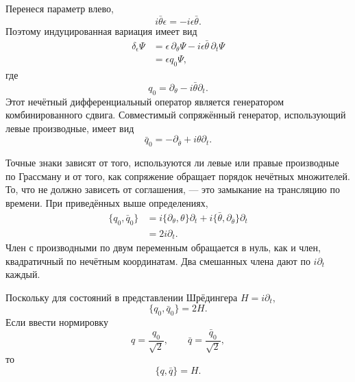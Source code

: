 Перенеся параметр влево,
\begin{equation}
i\bar\theta\epsilon=-i\epsilon\bar\theta.
\end{equation}
Поэтому индуцированная вариация имеет вид
\begin{align}
\delta_\epsilon\Psi
&=\epsilon\,\partial_\theta\Psi
-i\epsilon\bar\theta\,\partial_t\Psi\\
&=\epsilon q_0\Psi,
\end{align}
где
\begin{equation}
q_0=\partial_\theta-i\bar\theta\partial_t.
\end{equation}
Этот нечётный дифференциальный оператор является генератором комбинированного сдвига. Совместимый сопряжённый генератор, использующий левые производные, имеет вид
\begin{equation}
\bar q_0=-\partial_{\bar\theta}
+i\theta\partial_t.
\end{equation}

Точные знаки зависят от того, используются ли левые или правые производные по Грассману и от того, как сопряжение обращает порядок нечётных множителей. То, что не должно зависеть от соглашения, — это замыкание на трансляцию по времени. При приведённых выше определениях,
\begin{align}
\{q_0,\bar q_0\}
&=i\{\partial_\theta,\theta\}\partial_t
+i\{\bar\theta,\partial_{\bar\theta}\}\partial_t\\
&=2i\partial_t.
\end{align}
Член с производными по двум переменным обращается в нуль, как и член, квадратичный по нечётным координатам. Два смешанных члена дают по \(i\partial_t\) каждый.

Поскольку для состояний в представлении Шрёдингера \(H=i\partial_t\),
\begin{equation}
\{q_0,\bar q_0\}=2H.
\end{equation}
Если ввести нормировку
\begin{equation}
q=\frac{q_0}{\sqrt2},
\qquad
\bar q=\frac{\bar q_0}{\sqrt2},
\end{equation}
то
\begin{equation}
\boxed{\{q,\bar q\}=H.}
\end{equation}

